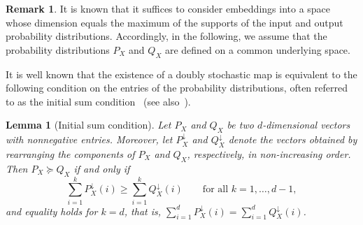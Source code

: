 \documentclass[aps,pra,11pt,onecolumn,nofootinbib,tightenlines]{revtex4-2}
\newtheorem{lemma}[theorem]{Lemma}
\theoremstyle{definition}
\newtheorem{remark}[theorem]{Remark}
\begin{document}
\begin{remark}
    It is known that it suffices to consider embeddings into a space whose dimension equals the maximum of the supports of the input and output probability distributions. Accordingly, in the following, we assume that the probability distributions $P_X$ and $Q_X$ are defined on a common underlying space. 
\end{remark}
It is well known that the existence of a doubly stochastic map is equivalent to the following condition on the entries of the probability distributions, often referred to as the initial sum condition~\cite{birkhoff1946tres} (see also~\cite{marshall1979inequalities}).
\begin{lemma}[Initial sum condition]
\label{lem: Initial sum condition}
Let \( P_X \) and \( Q_X \) be two $d$-dimensional vectors with nonnegative entries. Moreover, let \( P_X^{\downarrow} \) and \( Q_X^{\downarrow} \) denote the vectors obtained by rearranging the components of \( P_X \) and \( Q_X \), respectively, in non-increasing order. Then \( P_X \succeq Q_X \) if and only if
\begin{equation}
    \sum_{i=1}^{k} P_X^{\downarrow}(i) \geq \sum_{i=1}^{k} Q_X^{\downarrow}(i) \qquad \text{for all } k = 1, \ldots, d-1,
\end{equation}
and equality holds for \( k = d \), that is, $\sum_{i=1}^{d} P_X^{\downarrow}(i) = \sum_{i=1}^{d} Q_X^{\downarrow}(i)$.
\end{lemma}
\end{document}
